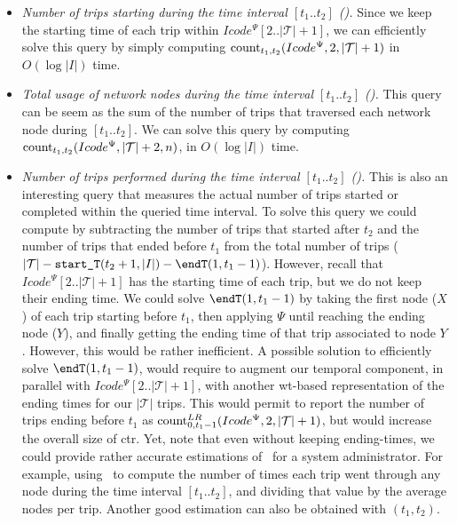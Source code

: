 	\begin{itemize}

	\item {\em Number of trips starting during the time interval $[t_1..t_2]$ (\startT).} Since we keep the
	starting time of each trip within $Icode^{\Psi}[2..|\mathcal{T}|+1]$, we can efficiently solve this query 
	by simply computing $\operatorname{count}_{t_1,t_2}(Icode^{\Psi},2,|\mathcal{T}|+1)$ in $O(\log|I|)$ time.

	\item  {\em Total usage of network nodes during the time interval $[t_1..t_2]$ (\loadT).} This query
	can be seem as the sum of the number of trips that traversed each network node during $[t_1..t_2]$.
	We can solve this query by computing $\operatorname{count}_{t_1,t_2}(Icode^{\Psi},|\mathcal{T}|+2,n)$, in $O(\log|I|)$ time.

	\item {\em Number of trips performed during the time interval $[t_1..t_2]$ (\tripT).} This is also an interesting query that measures the actual number of trips started or completed within the queried time interval. 
	To solve this query
	we could compute {\em \tripT} by subtracting the number of trips that started after $t_2$  and the number of trips that ended 	before $t_1$ from the total number of trips ($|\mathcal{T}| - \startT(t_2+1,|I|) - \endT(1,t_1-1)$). 
	However, recall that
	$Icode^{\Psi}[2..|\mathcal{T}|+1]$ has the starting time of each trip, but we do not keep their ending time.
	We could solve $\endT(1,t_1-1)$ by taking the first node ($X$) of each trip starting
	before $t_1$, then applying $\Psi$ until reaching the ending node ($Y$), and finally getting the ending
	time of that trip associated to node $Y$. However, this would be rather inefficient.
	A possible solution to efficiently solve $\endT(1,t_1-1)$, would require to augment our temporal
	component, in parallel with $Icode^{\Psi}[2..|\mathcal{T}|+1]$, with another \gls{wt}-based representation of the 
	ending times for our $|\mathcal{T}|$ trips. This would permit to report the number of trips
	ending before $t_1$ as $\operatorname{count}^{LR}_{0,t_1-1}(Icode^{\Psi},2,|\mathcal{T}|+1)$, but would increase the overall size of \gls{ctr}.
	Yet, note that even without keeping ending-times, we could 
	provide rather accurate estimations of \tripT\ for a system administrator. For example, using \loadT\
	to compute the number of times each trip went through any node during the time interval $[t_1..t_2]$, 
	and dividing that value by the average nodes per trip. Another good estimation can also be obtained with \startT$(t_1,t_2)$.



\end{itemize}
